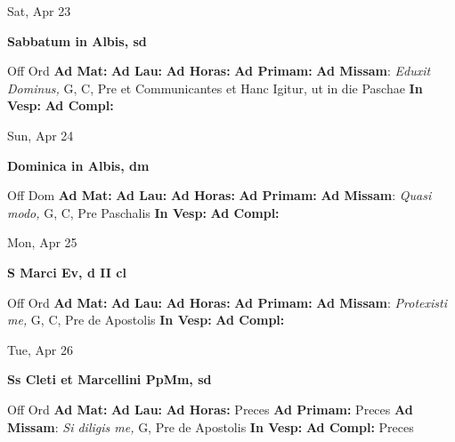 \documentclass[10pt]{article}
\begin{document}
\begin{minipage}{3.5in}
\vspace{2em}\begin{center}
Sat, Apr 23
\end{center}\textbf{ \large Sabbatum in Albis, \textnormal{\normalsize sd}}
\begin{justify}
Off Ord
\textbf{Ad Mat: }
\textbf{Ad Lau: }
\textbf{Ad Horas: }
\textbf{Ad Primam: }
\textbf{Ad Missam}: \textit{Eduxit Dominus,} G, C, Pre et Communicantes et Hanc Igitur, ut in die Paschae
\textbf{In Vesp: }
\textbf{Ad Compl: }\end{justify}
\end{minipage}



\begin{minipage}{3.5in}
\vspace{2em}\begin{center}
Sun, Apr 24
\end{center}\textbf{ \large Dominica in Albis, \textnormal{\normalsize dm}}
\begin{justify}
Off Dom
\textbf{Ad Mat: }
\textbf{Ad Lau: }
\textbf{Ad Horas: }
\textbf{Ad Primam: }
\textbf{Ad Missam}: \textit{Quasi modo,} G, C, Pre Paschalis
\textbf{In Vesp: }
\textbf{Ad Compl: }\end{justify}
\end{minipage}



\begin{minipage}{3.5in}
\vspace{2em}\begin{center}
Mon, Apr 25
\end{center}\textbf{ \large S Marci Ev, \textnormal{\normalsize d II cl}}
\begin{justify}
Off Ord
\textbf{Ad Mat: }
\textbf{Ad Lau: }
\textbf{Ad Horas: }
\textbf{Ad Primam: }
\textbf{Ad Missam}: \textit{Protexisti me,} G, C, Pre de Apostolis
\textbf{In Vesp: }
\textbf{Ad Compl: }\end{justify}
\end{minipage}



\begin{minipage}{3.5in}
\vspace{2em}\begin{center}
Tue, Apr 26
\end{center}\textbf{ \large Ss Cleti et Marcellini PpMm, \textnormal{\normalsize sd}}
\begin{justify}
Off Ord
\textbf{Ad Mat: }
\textbf{Ad Lau: }
\textbf{Ad Horas: }Preces
\textbf{Ad Primam: }Preces
\textbf{Ad Missam}: \textit{Si diligis me,} G, Pre de Apostolis
\textbf{In Vesp: }
\textbf{Ad Compl: }Preces\end{justify}
\end{minipage}
\end{document}
